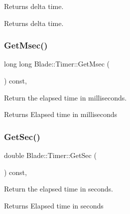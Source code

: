 Returns delta time. 

\begin{DoxyReturn}{Returns}
delta time. 
\end{DoxyReturn}
\mbox{\label{class_blade_1_1_timer_a83e1a3a261b33dff4e361c5eb8a7f4d8}} 
\subsubsection{\texorpdfstring{Get\+Msec()}{GetMsec()}}
{\footnotesize\ttfamily long long Blade\+::\+Timer\+::\+Get\+Msec (\begin{DoxyParamCaption}{ }\end{DoxyParamCaption}) const\hspace{0.3cm}{\ttfamily [inline]}, {\ttfamily [noexcept]}}



Return the elapsed time in milliseconds. 

\begin{DoxyReturn}{Returns}
Elapsed time in milliseconds 
\end{DoxyReturn}
\mbox{\label{class_blade_1_1_timer_abd1d2fce63f777d7c5a8557b87533cbd}} 
\subsubsection{\texorpdfstring{Get\+Sec()}{GetSec()}}
{\footnotesize\ttfamily double Blade\+::\+Timer\+::\+Get\+Sec (\begin{DoxyParamCaption}{ }\end{DoxyParamCaption}) const\hspace{0.3cm}{\ttfamily [inline]}, {\ttfamily [noexcept]}}



Return the elapsed time in seconds. 

\begin{DoxyReturn}{Returns}
Elapsed time in seconds 
\end{DoxyReturn}
\mbox{\label{class_blade_1_1_timer_ae5e5bf6cdb995dbeb15cb94d87026809}} 
